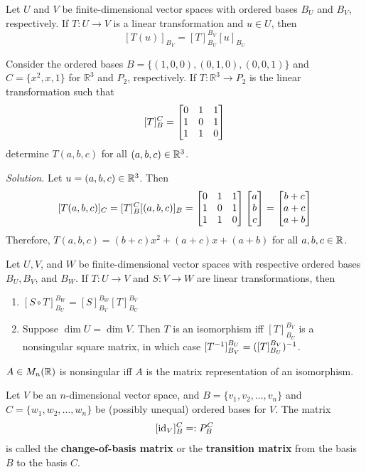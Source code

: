 \begin{theorem}
Let $U$ and $V$ be finite-dimensional vector spaces with ordered bases $B_U$ and $B_V$, respectively. If $T: U \to V$ is a linear transformation and $u \in U$, then
$$[T(u)]_{B_V} = [T]_{B_U}^{B_V}[u]_{B_U}$$
\end{theorem}

\begin{example}
Consider the ordered bases $B = \{(1, 0, 0), (0, 1, 0), (0, 0, 1)\}$ and $C = \{x^2, x, 1\}$ for $\mathbb{R}^3$ and $P_2$, respectively. If $T : \mathbb{R}^3 \to P_2$ is the linear transformation such that
$$[T]_B^C = \begin{bmatrix} 0 & 1 & 1 \\ 1 & 0 & 1 \\ 1 & 1 & 0 \end{bmatrix}$$
determine $T(a, b, c)$ for all $(a, b, c) \in \mathbb{R}^3$.
\end{example}

\textit{Solution.} Let $u = (a, b, c) \in \mathbb{R}^3$. Then
$$[T(a, b, c)]_C = [T]_B^C[(a, b, c)]_B = \begin{bmatrix} 0 & 1 & 1 \\ 1 & 0 & 1 \\ 1 & 1 & 0 \end{bmatrix}\begin{bmatrix} a \\ b \\ c \end{bmatrix} = \begin{bmatrix} b + c \\ a + c \\ a + b \end{bmatrix}$$
Therefore, $T(a, b, c) = (b + c)x^2 + (a + c)x + (a + b)$ for all $a,b,c \in \mathbb{R}$.

\begin{theorem}
Let $U, V$, and $W$ be finite-dimensional vector spaces with respective ordered bases $B_U, B_V$, and $B_W$. If $T: U \to V$ and $S: V \to W$ are linear transformations, then
\begin{enumerate}
    \item $[S \circ T]_{B_U}^{B_W} = [S]_{B_V}^{B_W}[T]_{B_U}^{B_V}$
    \item Suppose $\dim U = \dim V$. Then $T$ is an isomorphism iff $[T]_{B_U}^{B_V}$ is a nonsingular square matrix, in which case $[T^{-1}]_{B_V}^{B_U} = ([T]_{B_U}^{B_V})^{-1}$.
\end{enumerate}
\end{theorem}

\begin{remark}
$A \in M_n(\mathbb{R})$ is nonsingular iff $A$ is the matrix representation of an isomorphism.
\end{remark}

\begin{definition}
Let $V$ be an $n$-dimensional vector space, and $B = \{v_1, v_2, \dots, v_n\}$ and $C = \{w_1, w_2, \dots, w_n\}$ be (possibly unequal) ordered bases for $V$. The matrix
$$[\operatorname{id}_V]_B^C =: P_B^C$$
is called the \textbf{change-of-basis matrix} or the \textbf{transition matrix} from the basis $B$ to the basis $C$.
\end{definition}

